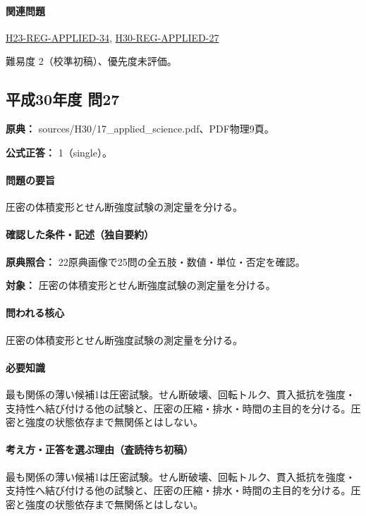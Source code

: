 \paragraph{関連問題} \hyperref[q:h23-reg-applied-34]{H23-REG-APPLIED-34}, \hyperref[q:h30-reg-applied-27]{H30-REG-APPLIED-27}

\par 難易度 2（校準初稿）、優先度未評価。

\subsection{平成30年度 問27}
\label{q:h30-reg-applied-27}

\noindent\textbf{原典：} sources/H30/17\_applied\_science.pdf、PDF物理9頁。

\textbf{公式正答：} 1（single）。

\paragraph{問題の要旨} 圧密の体積変形とせん断強度試験の測定量を分ける。

\paragraph{確認した条件・記述（独自要約）}\mbox{}\par

\noindent\textbf{原典照合：} 22原典画像で25問の全五肢・数値・単位・否定を確認。\par

\noindent\textbf{対象：} 圧密の体積変形とせん断強度試験の測定量を分ける。\par

\paragraph{問われる核心} 圧密の体積変形とせん断強度試験の測定量を分ける。

\paragraph{必要知識} 最も関係の薄い候補1は圧密試験。せん断破壊、回転トルク、貫入抵抗を強度・支持性へ結び付ける他の試験と、圧密の圧縮・排水・時間の主目的を分ける。圧密と強度の状態依存まで無関係とはしない。

\paragraph{考え方・正答を選ぶ理由（査読待ち初稿）} 最も関係の薄い候補1は圧密試験。せん断破壊、回転トルク、貫入抵抗を強度・支持性へ結び付ける他の試験と、圧密の圧縮・排水・時間の主目的を分ける。圧密と強度の状態依存まで無関係とはしない。

